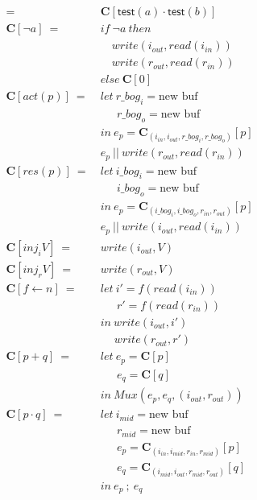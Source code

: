 \documentclass[12pt, letterpaper]{article}
\begin{document}
{\begin{align*}
         =\ &\mathbf{C}[\mathsf{test}(a) \cdot \mathsf{test}(b)] \\
      \mathbf{C}[\neg a]\ 
         =\ 
         &if\ \neg a\ then\\
         &\quad write(i_{out}, read(i_{in}))\\
         &\quad write(r_{out}, read(r_{in}))\\
         &else\ \mathbf{C}[0]\\
      \mathbf{C}[act(p)]\ 
        =\ &
        let\ r\_bog_i = \text{new buf}\\
        &\quad\ \ r\_bog_o = \text{new buf}\\
        &in\ e_p = \mathbf{C}_{(i_{in}, i_{out}, r\_bog_i, r\_bog_o)}[p]\\
        &e_p\ ||\ write(r_{out}, read(r_{in}))
        \\
      \mathbf{C}[res(p)]\ 
        =\ &
        let\ i\_bog_i = \text{new buf}\\
        &\quad\ \ i\_bog_o = \text{new buf}\\
        &in\ e_p = \mathbf{C}_{(i\_bog_i, i\_bog_o, r_{in}, r_{out})}[p]\\
        &e_p\ ||\ write(i_{out}, read(i_{in}))
        \\
      \mathbf{C}[inj_iV]\ 
        =\ &
        write(i_{out}, V)
        \\
      \mathbf{C}[inj_rV]\ 
        =\ &
        write(r_{out}, V)
        \\
      \mathbf{C}[f \leftarrow n]\ 
        =\ &
        let\ i' = f(read(i_{in}))\\
        &\quad\ \ r' = f(read(r_{in}))\\
        &in\ write(i_{out}, i')\\
        &\quad \ write(r_{out}, r')
        \\
      \mathbf{C}[p + q]\ 
        =\ &
        let\ e_p = \mathbf{C}[p]\\
        &\quad\ \ e_q = \mathbf{C}[q]\\
        &in\ Mux(e_p, e_q, (i_{out},r_{out}))
        \\
      \mathbf{C}[p \cdot q]\ 
        =\ &
        let\ i_{mid} = \text{new buf}\\
        &\quad\ \ r_{mid} = \text{new buf}\\
        &\quad\ \ e_p = \mathbf{C}_{(i_{in}, i_{mid}, r_{in}, r_{mid})}[p]\\
        &\quad\ \ e_q = \mathbf{C}_{(i_{mid}, i_{out}, r_{mid}, r_{out})}[q]\\
        &in\ e_p\ ;\ e_q
    \end{align*}
    }
\end{document}
